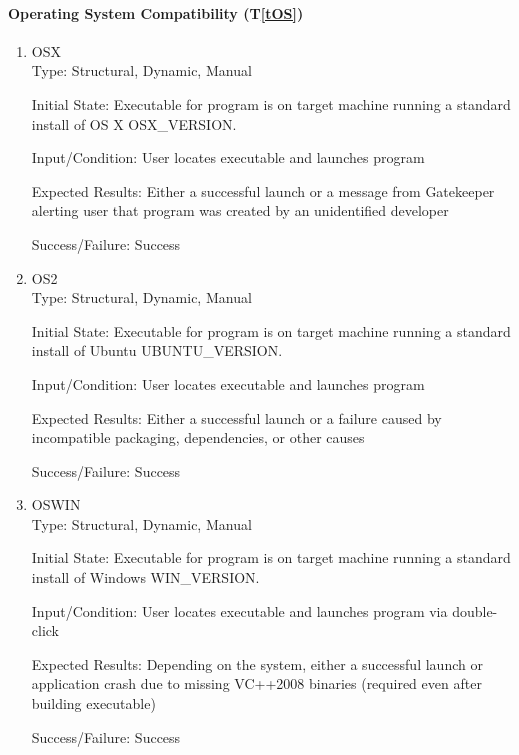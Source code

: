 \documentclass[12pt, titlepage]{article}
\newcommand{\tref}[1]{T\ref{#1}}
\begin{document}
	\paragraph{Operating System Compatibility (\tref{tOS})}
	\begin{enumerate}
		\item{OSX\\}
		Type: Structural, Dynamic, Manual
		
		Initial State: Executable for program is on target machine running a
		standard install of OS X OSX\_VERSION.
		
		Input/Condition: User locates executable and launches program
		
		Expected Results: Either a successful launch or a message from Gatekeeper
		alerting user that program was created by an unidentified developer

		Success/Failure: Success
		
		\item{OS2\\}
		Type: Structural, Dynamic, Manual
		
		Initial State: Executable for program is on target machine running a
		standard install of Ubuntu UBUNTU\_VERSION.
		
		Input/Condition: User locates executable and launches program
		
		Expected Results: Either a successful launch or a failure caused by incompatible
		packaging, dependencies, or other causes

		Success/Failure: Success

		\item{OSWIN\\}
		Type: Structural, Dynamic, Manual
		
		Initial State: Executable for program is on target machine running a
		standard install of Windows WIN\_VERSION.
		
		Input/Condition: User locates executable and launches program via double-click
		
		Expected Results: Depending on the system, either a successful launch or
		application crash due to missing VC++2008 binaries (required even after 
		building executable)

		Success/Failure: Success
	\end{enumerate}
\end{document}
